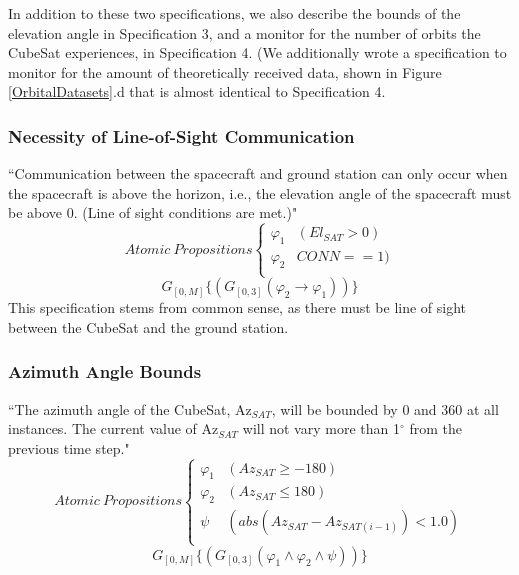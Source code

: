 \documentclass[conf]{new-aiaa}
\begin{document}
In addition to these two specifications, we also describe the bounds of the elevation angle in Specification 3, and a monitor for the number of orbits the CubeSat experiences, in Specification 4. (We additionally wrote a specification to monitor for the amount of theoretically received data, shown in Figure \ref{OrbitalDatasets}.d that is almost identical to Specification 4.

\subsubsection{\textbf{Necessity of Line-of-Sight Communication}}
“Communication between the spacecraft and ground station can only occur when the spacecraft is above the horizon, i.e., the elevation angle of the spacecraft must be above 0. (Line of sight conditions are met.)"
\[ Atomic\:Propositions \begin{cases}
  \varphi_1 & (El_{SAT} > 0) \\
  \varphi_2 & CONN == 1) \\
\end{cases} \]
\begin{equation}
    \label{Spec 1}
    G_{[0,M]} \{(G_{[0,3]}(\varphi_2 \rightarrow \varphi_1))\}
\end{equation} 
This specification stems from common sense, as there must be line of sight between the CubeSat and the ground station.

\subsubsection{\textbf{Azimuth Angle Bounds}}
“The azimuth angle of the CubeSat, Az$_{SAT}$, will be bounded by 0 and 360 at all instances. The current value of Az$_{SAT}$ will not vary more than 1$^{\circ}$ from the previous time step."
\[ Atomic\:Propositions \begin{cases}
  \varphi_1 & (Az_{SAT} \geq -180) \\
  \varphi_2 & (Az_{SAT} \leq 180) \\
  \psi & (abs(Az_{SAT} - Az_{SAT(i-1)}) < 1.0) \\
\end{cases} \]
\begin{equation}
    \label{Spec 2}
    G_{[0,M]} \{(G_{[0,3]}(\varphi_1 \wedge \varphi_2 \wedge \psi))\}
\end{equation} 
\end{document}
